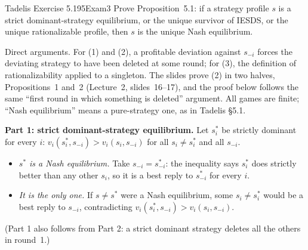 \begin{exsol}{Tadelis Exercise 5.1}{95}{Exam}{3}
\asked Prove Proposition~5.1: if a strategy profile $s$ is a strict dominant-strategy equilibrium, or
the unique survivor of IESDS, or the unique rationalizable profile, then $s$ is the unique Nash
equilibrium.

\method Direct arguments. For (1) and (2), a profitable deviation against $s_{-i}$ forces the
deviating strategy to have been deleted at some round; for (3), the definition of rationalizability
applied to a singleton. The slides prove (2) in two halves, Propositions~1 and~2 (Lecture~2,
slides~16--17), and the proof below follows the same ``first round in which something is deleted''
argument. All games are finite; ``Nash equilibrium'' means a pure-strategy one, as in Tadelis \S5.1.

\solution
\textbf{Part 1: strict dominant-strategy equilibrium.} Let $s_i^*$ be strictly dominant for every
$i$: $v_i(s_i^*, s_{-i}) > v_i(s_i, s_{-i})$ for all $s_i \ne s_i^*$ and all $s_{-i}$.
\begin{itemize}
  \item \emph{$s^*$ is a Nash equilibrium.} Take $s_{-i} = s^*_{-i}$: the inequality says $s_i^*$
  does strictly better than any other $s_i$, so it is a best reply to $s^*_{-i}$ for every $i$.
  \item \emph{It is the only one.} If $s \ne s^*$ were a Nash equilibrium, some $s_i \ne s_i^*$ would
  be a best reply to $s_{-i}$, contradicting $v_i(s_i^*, s_{-i}) > v_i(s_i, s_{-i})$.
\end{itemize}
(Part 1 also follows from Part 2: a strict dominant strategy deletes all the others in round~1.)


\end{exsol}
